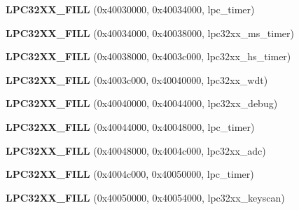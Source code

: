 \begin{DoxyCompactItemize}
\item 
\mbox{\label{structlpc32xx__registers_a4c775be1ea1da2e93e47ddeea7e02cf4}} 
{\bfseries L\+P\+C32\+X\+X\+\_\+\+F\+I\+LL} (0x40030000, 0x40034000, lpc\+\_\+timer)
\item 
\mbox{\label{structlpc32xx__registers_a40f6bc7bad02f7fe2294957c7e6b7539}} 
{\bfseries L\+P\+C32\+X\+X\+\_\+\+F\+I\+LL} (0x40034000, 0x40038000, lpc32xx\+\_\+ms\+\_\+timer)
\item 
\mbox{\label{structlpc32xx__registers_abde3e084d7b1a1680e27f2fa2554a327}} 
{\bfseries L\+P\+C32\+X\+X\+\_\+\+F\+I\+LL} (0x40038000, 0x4003c000, lpc32xx\+\_\+hs\+\_\+timer)
\item 
\mbox{\label{structlpc32xx__registers_af45f72a6d68ad0c36674bf82227685e7}} 
{\bfseries L\+P\+C32\+X\+X\+\_\+\+F\+I\+LL} (0x4003c000, 0x40040000, lpc32xx\+\_\+wdt)
\item 
\mbox{\label{structlpc32xx__registers_a0edc936b546db933358877d139ef0171}} 
{\bfseries L\+P\+C32\+X\+X\+\_\+\+F\+I\+LL} (0x40040000, 0x40044000, lpc32xx\+\_\+debug)
\item 
\mbox{\label{structlpc32xx__registers_aa6e843d43b0df669754cfa7b30bd9ca1}} 
{\bfseries L\+P\+C32\+X\+X\+\_\+\+F\+I\+LL} (0x40044000, 0x40048000, lpc\+\_\+timer)
\item 
\mbox{\label{structlpc32xx__registers_a341ad9637acd55ef8446cc117b61e064}} 
{\bfseries L\+P\+C32\+X\+X\+\_\+\+F\+I\+LL} (0x40048000, 0x4004c000, lpc32xx\+\_\+adc)
\item 
\mbox{\label{structlpc32xx__registers_ae357c1065b09d1ab406dac3de709550c}} 
{\bfseries L\+P\+C32\+X\+X\+\_\+\+F\+I\+LL} (0x4004c000, 0x40050000, lpc\+\_\+timer)
\item 
\mbox{\label{structlpc32xx__registers_aba740c624a4358d980cd8fadb74d5d03}} 
{\bfseries L\+P\+C32\+X\+X\+\_\+\+F\+I\+LL} (0x40050000, 0x40054000, lpc32xx\+\_\+keyscan)
\item 
\mbox{\label{structlpc32xx__registers_ac155b1b886ea6714baaed577e7572512}} 

\end{DoxyCompactItemize}
